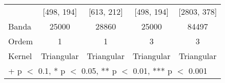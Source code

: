 \begin{table}
\begin{tabular}[t]{lcccc}
\hspace{1em} & {}[498, 194] & {}[613, 212] & {}[498, 194] & {}[2803, 378]\\
\hspace{1em}Banda & 25000 & 28860 & 25000 & 84497\\
\midrule
\hspace{1em}Ordem & 1 & 1 & 3 & 3\\
\hspace{1em}Kernel & Triangular & Triangular & Triangular & Triangular\\
\bottomrule
\multicolumn{5}{l}{\rule{0pt}{1em}+ p $<$ 0.1, * p $<$ 0.05, ** p $<$ 0.01, *** p $<$ 0.001}\\
\end{tabular}
\end{table}
